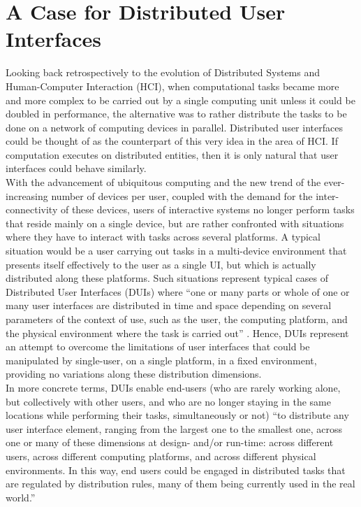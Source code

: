 \section{A Case for Distributed User Interfaces}
Looking back retrospectively to the
evolution of Distributed Systems and Human-Computer Interaction (HCI), when
computational tasks became more and more complex to be carried out by a single computing unit unless it
could be doubled in performance, the alternative was to rather distribute the
tasks to be done on a network of computing devices in parallel. Distributed user interfaces
could be thought of as the counterpart of this very idea in the area of HCI. If
computation executes on distributed entities, then it is only natural that user
interfaces could behave similarly.\\
With the advancement of ubiquitous computing and the new trend of the
ever-increasing number of devices per user, coupled with the demand for
the inter-connectivity of these devices, users of interactive systems no longer
perform tasks that reside mainly on a single device, but are rather confronted with situations where they have to interact with tasks across several
platforms. A typical situation would be a user carrying out tasks in a
multi-device environment that presents itself effectively to the user as a
single UI, but which is actually distributed along these platforms. Such situations
represent typical cases of Distributed User Interfaces (DUIs) where ``one or
many parts or whole of one or many user interfaces are distributed in time and
space depending on several parameters of the context of use, such as the user,
the computing platform, and the physical environment where the task is carried
out'' \cite{demeure20084c}. Hence, DUIs represent an attempt to overcome the
limitations of user interfaces that could be manipulated by single-user, on a
single platform, in a fixed environment, providing no variations along
these distribution dimensions.\\
In more concrete terms, DUIs enable end-users
(who are rarely working alone, but collectively with other users, and who are no
longer staying in the same locations while performing their tasks,
simultaneously or not) ``to distribute any user interface element, ranging from
the largest one to the smallest one, across one or many of these dimensions at
design- and/or run-time: across different users, across different computing
platforms, and across different physical environments. In this way, end users could be engaged in distributed tasks that are regulated by distribution rules, many of them being currently used in the real world.'' \cite{vanderdonckt2010distributed}\\
